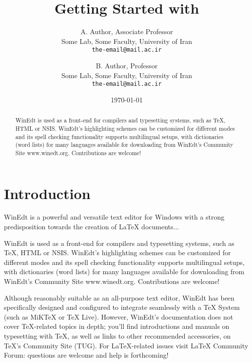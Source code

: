 \documentclass[11pt,a4paper,twocolumn]{article}
\begin{document}
	
	\title{Getting Started with \LaTeXe{}}
	
	\author{A. Author, Associate Professor \\
		Some Lab, Some Faculty, University of Iran\\
		\texttt{the-email@mail.ac.ir}\\
		\and B. Author, Professor\\
		Some Lab, Some Faculty, University of Iran\\
		\texttt{the-email@mail.ac.ir}
	}
	
	\date{\today}
	
	\maketitle
	
	\begin{abstract}
		WinEdt is used as a front-end for compilers and typesetting systems, such as TeX, HTML or NSIS. WinEdt's highlighting schemes can be customized for different modes and its spell checking functionality supports multilingual setups, with dictionaries (word lists) for many languages available for downloading from WinEdt's Community Site www.winedt.org. Contributions are welcome!
	\end{abstract}
	
	\section{Introduction} \label{section.intro}
	
	WinEdt is a powerful and versatile text editor for Windows with a strong predisposition towards the creation of LaTeX documents...
	
	WinEdt is used as a front-end for compilers and typesetting systems, such as TeX, HTML or NSIS. WinEdt's highlighting schemes can be customized for different modes and its spell checking functionality supports multilingual setups, with dictionaries (word lists) for many languages available for downloading from WinEdt's Community Site www.winedt.org. Contributions are welcome!
	
	Although reasonably suitable as an all-purpose text editor, WinEdt has been specifically designed and configured to integrate seamlessly with a TeX System (such as MiKTeX or TeX Live). However, WinEdt's documentation does not cover TeX-related topics in depth; you'll find introductions and manuals on typesetting with TeX, as well as links to other recommended accessories, on TeX's Community Site (TUG). For LaTeX-related issues visit LaTeX Community Forum: questions are welcome and help is forthcoming!
	
\end{document}
